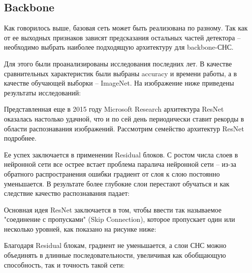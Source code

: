 \subsection{Backbone}

Как говорилось выше, базовая сеть может быть реализована по разному. Так как от ее выходных признаков зависят предсказания остальных частей детектора -- необходимо выбрать наиболее подходящую архитектуру для backbone-СНС.

Для этого были проанализированы исследования последних лет. В качестве сравнительных характеристик были выбраны accuracy и времени работы, а в качестве обучающей выборки -- ImageNet. На изображение ниже приведены результаты исследований:


Представленная еще в 2015 году Microsoft Research архитектура ResNet \cite{lib-resnet} оказалась настолько удачной, что и по сей день периодически ставит рекорды в области распознавания изображений. Рассмотрим семейство архитектур ResNet подробнее.

Ее успех заключается в применении Residual блоков. С ростом числа слоев в нейронной сети все острее встает проблема паралича нейронной сети -- из-за обратного распространения ошибки градиент от слоя к слою постоянно уменьшается. В результате более глубокие слои перестают обучаться и как следствие качество распознавания падает:


Основная идея ResNet заключается в том, чтобы ввести так называемое "соединение с пропусками" (Skip Connection), которое пропускает один или несколько уровней, как показано на рисунке ниже:


Благодаря Residual блокам, градиент не уменьшается, а слои СНС можно объединять в длинные последовательности, увеличивая как обобщающую способность, так и точность такой сети:

